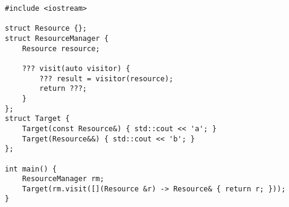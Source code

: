 \begin{lstlisting}[title=\href{https://godbolt.org/z/tgrjny}{\texttt{godbolt.org/z/tgrjny}}]
#include <iostream>

struct Resource {};
struct ResourceManager {
    Resource resource;

    ??? visit(auto visitor) {
        ??? result = visitor(resource);
        return ???;
    }
};
struct Target {
    Target(const Resource&) { std::cout << 'a'; }
    Target(Resource&&) { std::cout << 'b'; }
};

int main() {
    ResourceManager rm;
    Target(rm.visit([](Resource &r) -> Resource& { return r; }));
}
\end{lstlisting}
